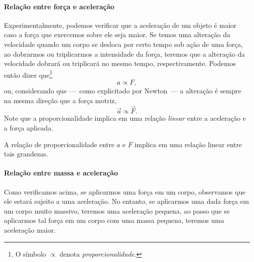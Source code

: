\paragraph{Relação entre força e aceleração}

Experimentalmente, podemos verificar que a aceleração de um objeto é maior caso a força que exercemos sobre ele seja maior. Se temos uma alteração da velocidade quando um corpo se desloca por certo tempo sob ação de uma força, ao dobrarmos ou triplicarmos a intensidade da força, teremos que a alteração da velocidade dobrará ou triplicará no mesmo tempo, respectivamente. Podemos então dizer que\footnote{O símbolo $\propto$ denota \emph{proporcionalidade}.}
\begin{equation}
  a \propto F,
\end{equation}
%
ou, considerando que ---~como explicitado por Newton~--- a alteração é sempre na mesma direção que a força motriz,
\begin{equation}
    \vec{a} \propto \vec{F}.
\end{equation}
%
Note que a proporcionalidade implica em uma relação \emph{linear} entre a aceleração e a força aplicada.

\begin{marginfigure}[-1cm]
\centering
{}
\caption{A relação de proporcionalidade entre $a$ e $F$ implica em uma relação linear entre tais grandezas.}
\end{marginfigure}

\paragraph{Relação entre massa e aceleração}

Como verificamos acima, se aplicarmos uma força em um corpo, observamos que ele estará sujeito a uma aceleração. No entanto, se aplicarmos uma dada força em um corpo muito massivo, teremos uma aceleração pequena, ao passo que se aplicarmos tal força em um corpo com uma massa pequena, teremos uma aceleração maior.

